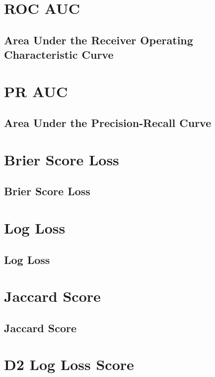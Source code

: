 \clearpage
\thispagestyle{customstyle}
\section{ROC AUC}
\subsection{Area Under the Receiver Operating Characteristic Curve}

\clearpage
\thispagestyle{customstyle}
\section{PR AUC}
\subsection{Area Under the Precision-Recall Curve}

\clearpage
\thispagestyle{customstyle}
\section{Brier Score Loss}
\subsection{Brier Score Loss}

\clearpage
\thispagestyle{customstyle}
\section{Log Loss}
\subsection{Log Loss}

\clearpage
\thispagestyle{customstyle}
\section{Jaccard Score}
\subsection{Jaccard Score}

\clearpage
\thispagestyle{customstyle}
\section{D2 Log Loss Score}
